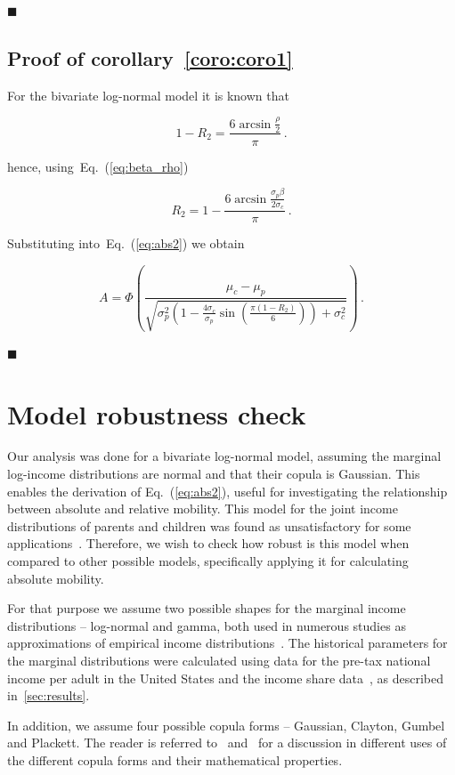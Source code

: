 \documentclass[12pt]{article}
\newcommand*{\qed}{\hfill\ensuremath{\blacksquare}}%
\newcommand{\eref}[1]{Eq.~(\ref{eq:#1})}
\newcommand{\creflong}[1]{corollary~\ref{coro:#1}}
\newcommand{\be}{\begin{equation}}
\newcommand{\ee}{\end{equation}}
\numberwithin{equation}{section}
\begin{document}
\qed

\subsection{Proof of \creflong{coro1}}

For the bivariate log-normal model it is known that~\citep{trivedi2007copula}

\be
1-R_2 = \frac{6\arcsin{\frac{\rho}{2}}}{\pi}\,.
\ee

hence, using~\eref{beta_rho}

\be
R_2 = 1- \frac{6\arcsin{\frac{\sigma_p\beta}{2\sigma_c}}}{\pi}\,.
\ee

Substituting into~\eref{abs2} we obtain

\be
A = \Phi\left(\frac{\mu_c - \mu_p}{\sqrt{\sigma_p^2\left(1 - \frac{4\sigma_c}{\sigma_p}\sin{\left(\frac{\pi\left(1-R_2\right)}{6}\right)}\right) + \sigma_c^2}}\right) \,.
\ee

\qed

\section{Model robustness check}
\label{app:appB}

Our analysis was done for a bivariate log-normal model, assuming the marginal log-income distributions are normal and that their copula is Gaussian. This enables the derivation of \eref{abs2}, useful for investigating the relationship between absolute and relative mobility. This model for the joint income distributions of parents and children was found as unsatisfactory for some applications~\citep{bonhomme2009assessing}. Therefore, we wish to check how robust is this model when compared to other possible models, specifically applying it for calculating absolute mobility.

For that purpose we assume two possible shapes for the marginal income distributions -- log-normal and gamma, both used in numerous studies as approximations of empirical income distributions~\citep{salem1974convenient,pinkovskiy2009parametric}. The historical parameters for the marginal distributions were calculated using data for the pre-tax national income per adult in the United States and the income share data~\citep{WID2017}, as described in~\ref{sec:results}.

In addition, we assume four possible copula forms -- Gaussian, Clayton, Gumbel and Plackett. The reader is referred to~\citet{trivedi2007copula} and~\citet{bonhomme2009assessing} for a discussion in different uses of the different copula forms and their mathematical properties.
\end{document}
